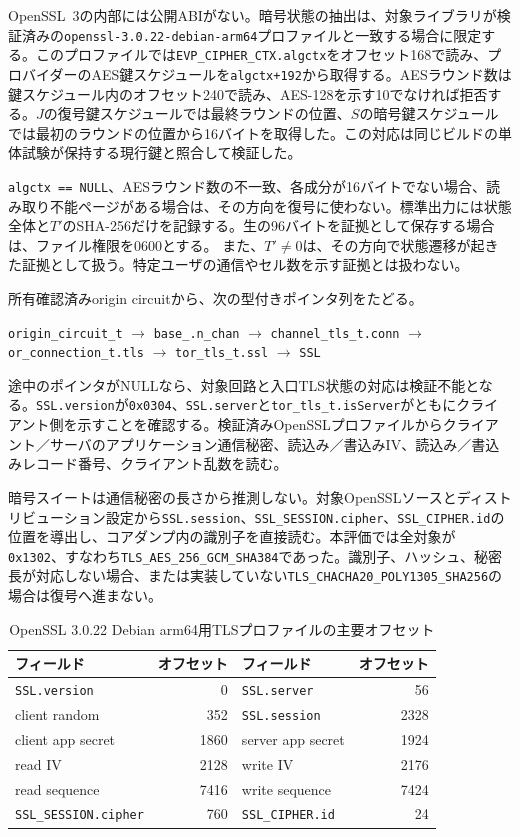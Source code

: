 \documentclass[10pt,a4paper]{ltjsarticle}
\newcommand{\code}[1]{\nolinkurl{#1}}
\begin{document}
OpenSSL~3の内部には公開ABIがない。暗号状態の抽出は、対象ライブラリが検証済みの\code{openssl-3.0.22-debian-arm64}プロファイルと一致する場合に限定する。このプロファイルでは\code{EVP_CIPHER_CTX.algctx}をオフセット168で読み、プロバイダーのAES鍵スケジュールを\code{algctx+192}から取得する。AESラウンド数は鍵スケジュール内のオフセット240で読み、AES-128を示す10でなければ拒否する。$J$の復号鍵スケジュールでは最終ラウンドの位置、$S$の暗号鍵スケジュールでは最初のラウンドの位置から16バイトを取得した。この対応は同じビルドの単体試験が保持する現行鍵と照合して検証した。

\code{algctx == NULL}、AESラウンド数の不一致、各成分が16バイトでない場合、読み取り不能ページがある場合は、その方向を復号に使わない。標準出力には状態全体と$T'$のSHA-256だけを記録する。生の96バイトを証拠として保存する場合は、ファイル権限を0600とする。
また、$T'\neq 0$は、その方向で状態遷移が起きた証拠として扱う。特定ユーザの通信やセル数を示す証拠とは扱わない。


所有確認済みorigin circuitから、次の型付きポインタ列をたどる。

\begin{center}
\small
\code{origin_circuit_t} $\rightarrow$ \code{base_.n_chan} $\rightarrow$
\code{channel_tls_t.conn} $\rightarrow$ \code{or_connection_t.tls}
$\rightarrow$ \code{tor_tls_t.ssl} $\rightarrow$ \code{SSL}
\end{center}

途中のポインタがNULLなら、対象回路と入口TLS状態の対応は検証不能となる。\code{SSL.version}が\code{0x0304}、\code{SSL.server}と\code{tor_tls_t.isServer}がともにクライアント側を示すことを確認する。検証済みOpenSSLプロファイルからクライアント／サーバのアプリケーション通信秘密、読込み／書込みIV、読込み／書込みレコード番号、クライアント乱数を読む。

暗号スイートは通信秘密の長さから推測しない。対象OpenSSLソースとディストリビューション設定から\code{SSL.session}、\code{SSL_SESSION.cipher}、\code{SSL_CIPHER.id}の位置を導出し、コアダンプ内の識別子を直接読む。本評価では全対象が\code{0x1302}、すなわち\code{TLS_AES_256_GCM_SHA384}であった。識別子、ハッシュ、秘密長が対応しない場合、または実装していない\code{TLS_CHACHA20_POLY1305_SHA256}の場合は復号へ進まない。

\begin{table}[!tbp]
\centering
\caption{OpenSSL 3.0.22 Debian arm64用TLSプロファイルの主要オフセット}
\label{tab:tls-profile}
\small
\begin{tabular}{lr@{\qquad}lr}
\toprule
フィールド & オフセット & フィールド & オフセット \\
\midrule
\code{SSL.version} & 0 & \code{SSL.server} & 56 \\
client random & 352 & \code{SSL.session} & 2328 \\
client app secret & 1860 & server app secret & 1924 \\
read IV & 2128 & write IV & 2176 \\
read sequence & 7416 & write sequence & 7424 \\
\code{SSL_SESSION.cipher} & 760 & \code{SSL_CIPHER.id} & 24 \\
\bottomrule
\end{tabular}
\end{table}
\end{document}
